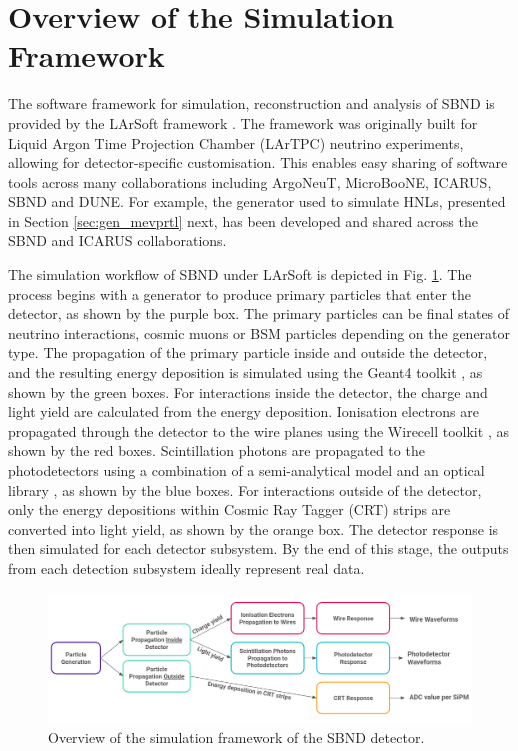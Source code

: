 \section{Overview of the Simulation Framework}
\label{sec:overview_sim}

The software framework for simulation, reconstruction and analysis of SBND is provided by the LArSoft framework \cite{larsoft}. 
The framework was originally built for Liquid Argon Time Projection Chamber (LArTPC) neutrino experiments, allowing for detector-specific customisation. 
This enables easy sharing of software tools across many collaborations including ArgoNeuT, MicroBooNE, ICARUS, SBND and DUNE. 
For example, the generator used to simulate HNLs, presented in Section \ref{sec:gen_mevprtl} next, has been developed and shared across the SBND and ICARUS collaborations.

The simulation workflow of SBND under LArSoft is depicted in Fig. \ref{fig:Sim_Workflow}.
The process begins with a generator to produce primary particles that enter the detector, as shown by the purple box.
The primary particles can be final states of neutrino interactions, cosmic muons or BSM particles depending on the generator type.
The propagation of the primary particle inside and outside the detector, and the resulting energy deposition is simulated using the Geant4 toolkit \cite{geant4}, as shown by the green boxes.
For interactions inside the detector, the charge and light yield are calculated from the energy deposition.
Ionisation electrons are propagated through the detector to the wire planes using the Wirecell toolkit \cite{wirecell}, as shown by the red boxes.
Scintillation photons are propagated to the photodetectors using a combination of a semi-analytical model and an optical library \cite{sbnd_pds_paper}, as shown by the blue boxes.
For interactions outside of the detector, only the energy depositions within Cosmic Ray Tagger (CRT) strips are converted into light yield, as shown by the orange box.
The detector response is then simulated for each detector subsystem.
By the end of this stage, the outputs from each detection subsystem ideally represent real data.

\begin{figure}[htbp!] 
\centering    
\includegraphics[width=1.0\textwidth]{Sim_Workflow}
\caption[Simulation Framework of SBND]{
Overview of the simulation framework of the SBND detector.
}
\label{fig:Sim_Workflow}
\end{figure}

